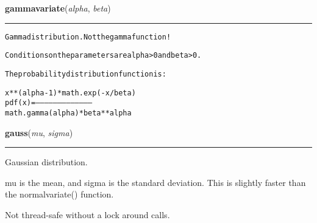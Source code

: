     \label{random:gammavariate}

    \vspace{0.5ex}

\hspace{.8\funcindent}\begin{boxedminipage}{\funcwidth}

    \raggedright \textbf{gammavariate}(\textit{alpha}, \textit{beta})

    \vspace{-1.5ex}

    \rule{\textwidth}{0.5\fboxrule}
\setlength{\parskip}{2ex}
\begin{alltt}
Gamma distribution.  Not the gamma function!

Conditions on the parameters are alpha {\textgreater} 0 and beta {\textgreater} 0.

The probability distribution function is:

            x ** (alpha - 1) * math.exp(-x / beta)
  pdf(x) =  --------------------------------------
              math.gamma(alpha) * beta ** alpha
\end{alltt}

\setlength{\parskip}{1ex}
    \end{boxedminipage}

    \label{random:gauss}

    \vspace{0.5ex}

\hspace{.8\funcindent}\begin{boxedminipage}{\funcwidth}

    \raggedright \textbf{gauss}(\textit{mu}, \textit{sigma})

    \vspace{-1.5ex}

    \rule{\textwidth}{0.5\fboxrule}
\setlength{\parskip}{2ex}
    Gaussian distribution.

    mu is the mean, and sigma is the standard deviation.  This is slightly 
    faster than the normalvariate() function.

    Not thread-safe without a lock around calls.

\setlength{\parskip}{1ex}
    \end{boxedminipage}

    \label{random:getrandbits}

